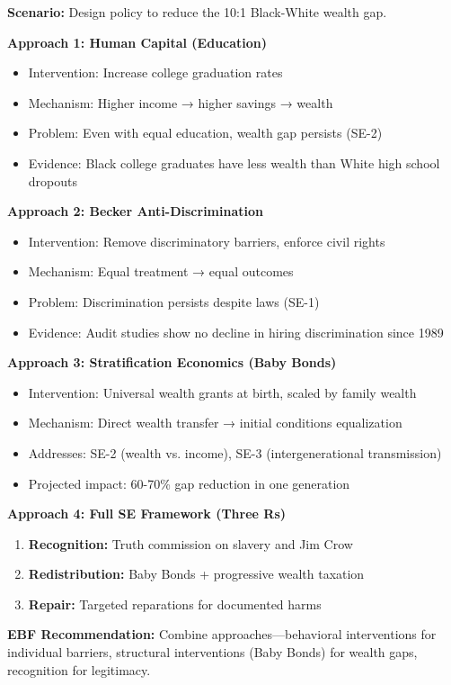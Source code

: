\begin{tcolorbox}[colback=yellow!5!white,colframe=yellow!75!black,title=Worked Example: Comparing Policy Approaches]
\textbf{Scenario:} Design policy to reduce the 10:1 Black-White wealth gap.

\textbf{Approach 1: Human Capital (Education)}
\begin{itemize}
    \item Intervention: Increase college graduation rates
    \item Mechanism: Higher income → higher savings → wealth
    \item Problem: Even with equal education, wealth gap persists (SE-2)
    \item Evidence: Black college graduates have less wealth than White high school dropouts
\end{itemize}

\textbf{Approach 2: Becker Anti-Discrimination}
\begin{itemize}
    \item Intervention: Remove discriminatory barriers, enforce civil rights
    \item Mechanism: Equal treatment → equal outcomes
    \item Problem: Discrimination persists despite laws (SE-1)
    \item Evidence: Audit studies show no decline in hiring discrimination since 1989
\end{itemize}

\textbf{Approach 3: Stratification Economics (Baby Bonds)}
\begin{itemize}
    \item Intervention: Universal wealth grants at birth, scaled by family wealth
    \item Mechanism: Direct wealth transfer → initial conditions equalization
    \item Addresses: SE-2 (wealth vs. income), SE-3 (intergenerational transmission)
    \item Projected impact: 60-70\% gap reduction in one generation
\end{itemize}

\textbf{Approach 4: Full SE Framework (Three Rs)}
\begin{enumerate}
    \item \textbf{Recognition:} Truth commission on slavery and Jim Crow
    \item \textbf{Redistribution:} Baby Bonds + progressive wealth taxation
    \item \textbf{Repair:} Targeted reparations for documented harms
\end{enumerate}

\textbf{EBF Recommendation:} Combine approaches---behavioral interventions for individual barriers, structural interventions (Baby Bonds) for wealth gaps, recognition for legitimacy.
\end{tcolorbox}

